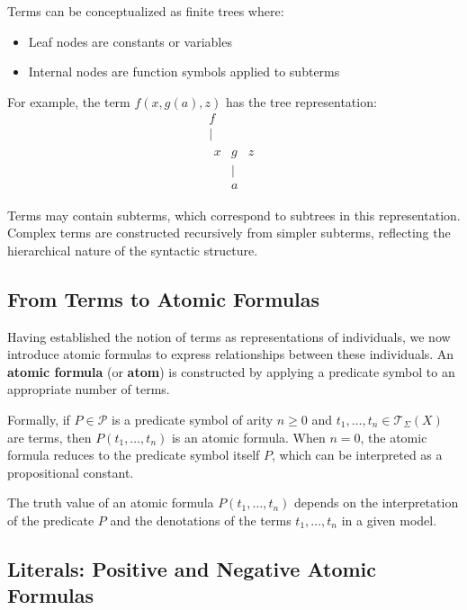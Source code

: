 \documentclass[11pt,a4paper]{article}
\theoremstyle{definition}
\theoremstyle{plain}
\theoremstyle{remark}
\begin{document}
Terms can be conceptualized as finite trees where:
\begin{itemize}
    \item Leaf nodes are constants or variables
    \item Internal nodes are function symbols applied to subterms
\end{itemize}

For example, the term $f(x, g(a), z)$ has the tree representation:
\[
\begin{array}{c}
  f \\
  | \\
  \begin{array}{ccc}
    x & g & z \\
       & | & \\
       & a &
  \end{array}
\end{array}
\]


Terms may contain subterms, which correspond to subtrees in this representation. Complex terms are constructed recursively from simpler subterms, reflecting the hierarchical nature of the syntactic structure.

\subsection{From Terms to Atomic Formulas}

Having established the notion of terms as representations of individuals, we now introduce atomic formulas to express relationships between these individuals. An \textbf{atomic formula} (or \textbf{atom}) is constructed by applying a predicate symbol to an appropriate number of terms.

Formally, if $P \in \mathcal{P}$ is a predicate symbol of arity $n \geq 0$ and $t_1, \dots, t_n \in \mathcal{T}_\Sigma(X)$ are terms, then $P(t_1, \dots, t_n)$ is an atomic formula. When $n = 0$, the atomic formula reduces to the predicate symbol itself $P$, which can be interpreted as a propositional constant.

The truth value of an atomic formula $P(t_1, \dots, t_n)$ depends on the interpretation of the predicate $P$ and the denotations of the terms $t_1, \dots, t_n$ in a given model.

\subsection{Literals: Positive and Negative Atomic Formulas}
\end{document}
